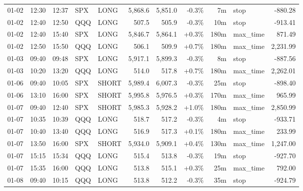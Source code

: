 \documentclass[11pt,a4paper,twoside]{article}
\begin{document}
\begin{center}
\begin{longtable}{>{\color{txtmain}}l l l l l r r r r >{\color{txtmain}}l r}
01-02 & 12:30 & 12:37 & SPX & LONG & 5,868.6 & 5,851.0 & \textcolor{lossred}{-0.3\%} & 7m & stop & \textcolor{lossred}{-880.28} \\
01-02 & 12:40 & 12:50 & QQQ & LONG & 507.5 & 505.9 & \textcolor{lossred}{-0.3\%} & 10m & stop & \textcolor{lossred}{-913.41} \\
01-02 & 12:40 & 15:40 & SPX & LONG & 5,846.7 & 5,864.1 & \textcolor{wingreen}{+0.3\%} & 180m & max\_time & \textcolor{wingreen}{871.49} \\
01-02 & 12:50 & 15:50 & QQQ & LONG & 506.1 & 509.9 & \textcolor{wingreen}{+0.7\%} & 180m & max\_time & \textcolor{wingreen}{2,231.99} \\
01-03 & 09:40 & 09:48 & SPX & LONG & 5,917.1 & 5,899.3 & \textcolor{lossred}{-0.3\%} & 8m & stop & \textcolor{lossred}{-887.56} \\
01-03 & 10:20 & 13:20 & QQQ & LONG & 514.0 & 517.8 & \textcolor{wingreen}{+0.7\%} & 180m & max\_time & \textcolor{wingreen}{2,262.01} \\
01-06 & 09:40 & 10:05 & SPX & SHORT & 5,989.4 & 6,007.3 & \textcolor{lossred}{-0.3\%} & 25m & stop & \textcolor{lossred}{-898.40} \\
01-06 & 13:10 & 16:00 & SPX & SHORT & 5,995.8 & 5,976.5 & \textcolor{wingreen}{+0.3\%} & 170m & max\_time & \textcolor{wingreen}{965.99} \\
01-07 & 09:40 & 12:40 & SPX & SHORT & 5,985.3 & 5,928.2 & \textcolor{wingreen}{+1.0\%} & 180m & max\_time & \textcolor{wingreen}{2,850.99} \\
01-07 & 10:35 & 10:39 & QQQ & LONG & 518.7 & 517.2 & \textcolor{lossred}{-0.3\%} & 4m & stop & \textcolor{lossred}{-933.71} \\
01-07 & 10:40 & 13:40 & QQQ & LONG & 516.9 & 517.3 & \textcolor{wingreen}{+0.1\%} & 180m & max\_time & \textcolor{wingreen}{233.99} \\
01-07 & 13:50 & 16:00 & SPX & SHORT & 5,934.0 & 5,909.1 & \textcolor{wingreen}{+0.4\%} & 130m & max\_time & \textcolor{wingreen}{1,247.00} \\
01-07 & 15:15 & 15:34 & QQQ & LONG & 515.4 & 513.8 & \textcolor{lossred}{-0.3\%} & 19m & stop & \textcolor{lossred}{-927.70} \\
01-07 & 15:35 & 16:00 & QQQ & LONG & 513.8 & 515.1 & \textcolor{wingreen}{+0.3\%} & 25m & max\_time & \textcolor{wingreen}{792.00} \\
01-08 & 09:40 & 10:15 & QQQ & LONG & 513.8 & 512.2 & \textcolor{lossred}{-0.3\%} & 35m & stop & \textcolor{lossred}{-924.79} \\

\end{longtable}
\end{center}
\end{document}
